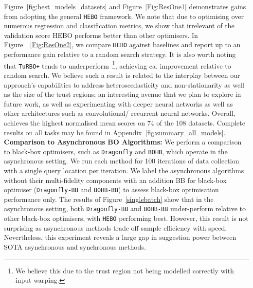\documentclass[jair,twoside,11pt,theapa]{article}
\theoremstyle{definition}
\begin{document}
Figure~\ref{fig:best_models_datasets} and Figure~\ref{Fig:ResOne1} demonstrates gains from adopting the general \texttt{HEBO} framework. We note that due to optimising over numerous regression and classification metrics, we show that irrelevant of the validation score HEBO performs better than other optimisers. In Figure~~\ref{Fig:ResOne2}, we compare \texttt{HEBO} against baselines and report up to an  performance gain relative to a random search strategy. It is also worth noting that \texttt{TuRBO+} tends to underperform~\footnote{We believe this due to the trust region not being modelled correctly with input warping.}, achieving ca.  improvement relative to random search. We believe such a result is related to the interplay between our approach's capabilities to address heteroscedasticity and non-stationarity as well as the size of the trust regions; an interesting avenue that we plan to explore in future work, as well as experimenting with deeper neural networks as well as other architectures such as convolutional/ recurrent neural networks. Overall,  achieves the highest normalised mean scores on 74 of the 108 datasets. Complete results on all tasks may be found in Appendix~\ref{fig:summary_all_models}. \\







\textbf{Comparison to Asynchronous BO Algorithms:} We perform a comparison to black-box optimisers, such as \texttt{Dragonfly} and \texttt{BOHB}, which operate in the asynchronous setting. We run each method for 100 iterations of data collection with a single query location per iteration. We label the asynchronous algorithms without their multi-fidelity components with an addition BB for black-box optimiser (\texttt{Dragonfly-BB} and \texttt{BOHB-BB}) to assess black-box optimisation performance only. The results of Figure~\autoref{singlebatch} show that in the asynchronous setting, both \texttt{Dragonfly-BB} and \texttt{BOHB-BB} under-perform relative to other black-box optimisers, with \texttt{HEBO} performing best. However, this result is not surprising as asynchronous methods trade off sample efficiency with speed. Nevertheless, this experiment reveals a large gap in suggestion power between SOTA asynchronous and synchronous methods.
\end{document}
